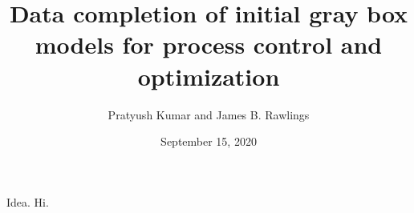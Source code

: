 \documentclass[xcolor=dvipsnames, 8pt]{beamer} %
\title[Data completion of initial gray box models for process control and optimization]{Data completion of initial gray box models for process control and optimization}
\date{September 15, 2020}
\author[Kumar and Rawlings]{\large Pratyush Kumar and James B. Rawlings}
\institute[UCSB]{
	\begin{minipage}{4in}
		\vspace{-10pt}
		\centering
		\raisebox{-0.1\height}{\texttt{[image: UCSB\_seal]}}
	\end{minipage}
	\vspace{10pt}
	\newline
	{\large Department of Chemical Engineering}
	\vspace{10pt}
	\newline
	{\large TWCCC Meeting (Virtual)}}
\begin{document}
\frame{\titlepage}

\begin{frame}{Idea.}
Hi.
\end{frame}

%
%
\end{document}
